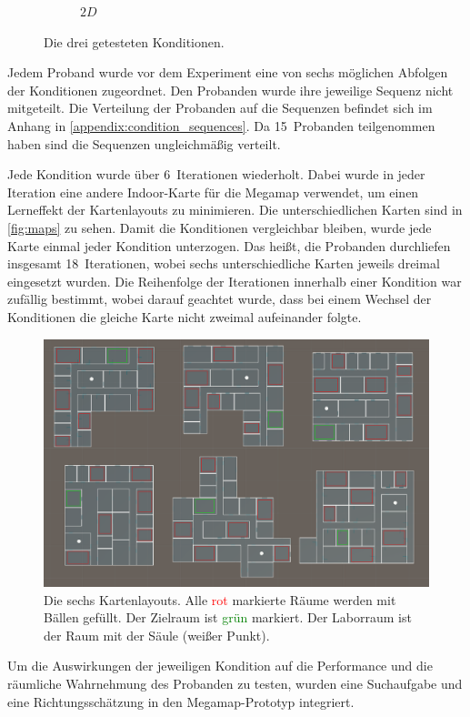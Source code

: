 \begin{figure}[h]
\begin{subfigure}{0.33\linewidth}
        \caption{$2D$}
    \end{subfigure}%
    \caption{Die drei getesteten Konditionen.}
    \label{fig:conditions}
\end{figure}
Jedem Proband wurde vor dem Experiment eine von sechs möglichen Abfolgen der Konditionen zugeordnet.
Den Probanden wurde ihre jeweilige Sequenz nicht mitgeteilt.
Die Verteilung der Probanden auf die Sequenzen befindet sich im Anhang in \autoref{appendix:condition_sequences}.
Da 15~Probanden teilgenommen haben sind die Sequenzen ungleichmäßig verteilt.

Jede Kondition wurde über 6~Iterationen wiederholt.
Dabei wurde in jeder Iteration eine andere Indoor-Karte für die Megamap verwendet, um einen Lerneffekt der Kartenlayouts zu minimieren.
Die unterschiedlichen Karten sind in \autoref{fig:maps} zu sehen.
Damit die Konditionen vergleichbar bleiben, wurde jede Karte einmal jeder Kondition unterzogen.
Das heißt, die Probanden durchliefen insgesamt 18~Iterationen, wobei sechs unterschiedliche Karten jeweils dreimal eingesetzt wurden.
Die Reihenfolge der Iterationen innerhalb einer Kondition war zufällig bestimmt, wobei darauf geachtet wurde, dass bei einem Wechsel der Konditionen die gleiche Karte nicht zweimal aufeinander folgte.
\begin{figure}[h]
    \centering
    \includegraphics[width=\linewidth]{figures/screenshots/maps_all}
    \caption{Die sechs Kartenlayouts. %
    Alle \textcolor{red}{rot} markierte Räume werden mit Bällen gefüllt. %
    Der Zielraum ist \textcolor{green}{grün} markiert. %
    Der Laborraum ist der Raum mit der Säule (weißer Punkt).}
    \label{fig:maps}
\end{figure}

Um die Auswirkungen der jeweiligen Kondition auf die Performance und die räumliche Wahrnehmung des Probanden zu testen, wurden eine Suchaufgabe und eine Richtungsschätzung in den Megamap-Prototyp integriert.

